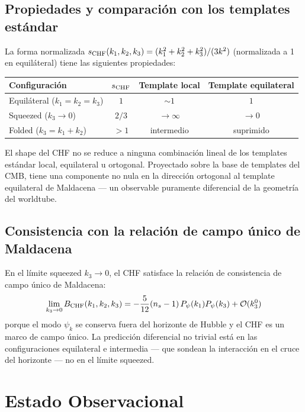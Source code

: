 \documentclass[12pt,a4paper]{article}
\begin{document}
\subsection{Propiedades y comparación con los templates estándar}

La forma normalizada $s_{\rm CHF}(k_1,k_2,k_3) = (k_1^2+k_2^2+k_3^2)/(3k^2)$ (normalizada a 1 en equiláteral) tiene las siguientes propiedades:

\begin{table}[h]
\centering
\small
\begin{tabular}{@{}lccc@{}}
\toprule
Configuración & $s_{\rm CHF}$ & Template local & Template equilateral \\
\midrule
Equiláteral ($k_1=k_2=k_3$) & $1$ & $\sim 1$ & $1$ \\[2pt]
Squeezed ($k_3\to 0$) & $2/3$ & $\to \infty$ & $\to 0$ \\[2pt]
Folded ($k_3 = k_1+k_2$) & $> 1$ & intermedio & suprimido \\
\bottomrule
\end{tabular}
\end{table}

El shape del CHF no se reduce a ninguna combinación lineal de los templates estándar local, equilateral u ortogonal. Proyectado sobre la base de templates del CMB, tiene una componente no nula en la dirección ortogonal al template equilateral de Maldacena --- un observable puramente diferencial de la geometría del worldtube.

\subsection{Consistencia con la relación de campo único de Maldacena}

En el límite squeezed $k_3 \to 0$, el CHF satisface la relación de consistencia de campo único de Maldacena:
\begin{equation*}
\lim_{k_3\to 0}B_{\rm CHF}(k_1,k_2,k_3) = -\frac{5}{12}(n_s-1)\,P_\psi(k_1)P_\psi(k_3) + \mathcal{O}(k_3^0)
\end{equation*}
porque el modo $\psi_k$ se conserva fuera del horizonte de Hubble y el CHF es un marco de campo único. La predicción diferencial no trivial está en las configuraciones equilateral e intermedia --- que sondean la interacción en el cruce del horizonte --- no en el límite squeezed.

\section{Estado Observacional}
\end{document}
